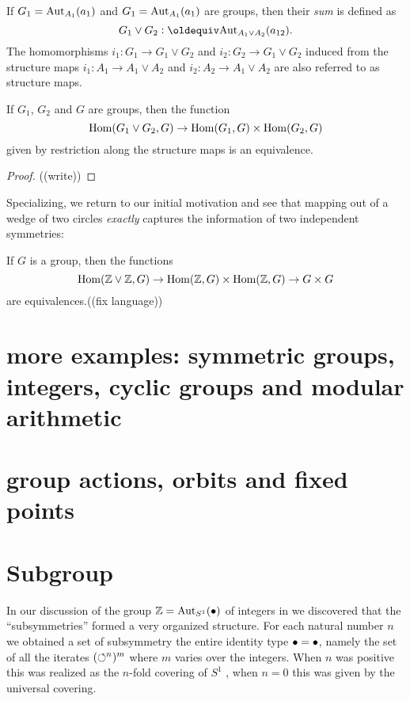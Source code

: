 \begin{definition}
  \label{def:sumofgroup}
  If $G_1=\mathrm{Aut}_{A_1}(a_1)$ and $G_1=\mathrm{Aut}_{A_1}(a_1)$ are groups, then their \emph{sum} is defined as
  $$G_1\vee G_2\defequi \aut_{A_1\vee A_2}(a_{12}).$$ The homomorphisms $i_1:G_1\to G_1\vee G_2$ and $i_2:G_2\to G_1\vee G_2$ induced from the structure maps  $i_1:A_1\to A_1\vee A_2$ and  $i_2:A_2\to A_1\vee A_2$ are also referred to as structure maps.
\end{definition}
\begin{lemma}
  \label{lem:sumofgroupsISsum} If $G_1$, $G_2$ and $G$ are groups, then the function
  $$\mathrm{Hom}(G_1\vee G_2,G)\to\mathrm{Hom}(G_1,G)\times\mathrm{Hom}(G_2,G)$$ 
given by restriction along the structure maps is an equivalence.
\end{lemma}
\begin{proof}
  ((write))
\end{proof}
Specializing, we return to our initial motivation and see that mapping out of a wedge of two circles \emph{exactly} captures the information of two independent symmetries:
\begin{corollary}
  \label{cor:ZplusZuniv}
  If $G$ is a group, then the functions
  $$\mathrm{Hom}(\mathbb{Z}\vee\mathbb{Z},G)\to \mathrm{Hom}(\mathbb{Z},G)\times\mathrm{Hom}(\mathbb{Z},G)\to G\times G$$
  are equivalences.((fix language))
\end{corollary}


\section{more examples: symmetric groups, integers, cyclic groups and modular arithmetic}
\section{group actions, orbits and fixed points}
\section{Subgroup}
\label{sec:subgroups}
In our discussion of the group $\mathbb{Z}=\mathrm{Aut}_{S^1}(\bullet)$ of integers in we discovered that the ``subsymmetries'' formed a very organized structure.  For each natural number $n$ we obtained a set of subsymmetry the entire identity type $\bullet=\bullet$, namely the set of all the iterates $(\circlearrowleft^{n})^m$ where $m$ varies over the integers.  When $n$ was positive this was realized as the $n$-fold covering of $S^1$ , when $n=0$ this was given by the universal covering.  

